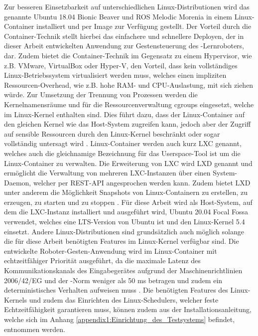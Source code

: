 Zur besseren Einsetzbarkeit auf unterschiedlichen Linux-Distributionen wird das genannte Ubuntu 18.04 Bionic Beaver und ROS Melodic Morenia in einem Linux-Container installiert und per Image zur Verfügung gestellt. Der Vorteil durch die Container-Technik stellt hierbei das einfachere und schnellere Deployen, der in dieser Arbeit entwickelten Anwendung zur Gestensteuerung des -Lernroboters, dar. Zudem bietet die Container-Technik im Gegensatz zu einem Hypervisor, wie z.B. VMware, VirtualBox oder Hyper-V, den Vorteil, dass kein vollständiges Linux-Betriebssystem virtualisiert werden muss, welches einen impliziten Ressourcen-Overhead, wie z.B. hohe RAM- und CPU-Auslastung, mit sich ziehen würde. Zur Umsetzung der Trennung von Prozessen werden die Kernelnamensräume und für die Ressourcenverwaltung cgroups eingesetzt, welche im Linux-Kernel enthalten sind. Dies führt dazu, dass der Linux-Container auf den gleichen Kernel wie das Host-System zugreifen kann, jedoch aber der Zugriff auf sensible Ressourcen durch den Linux-Kernel beschränkt oder sogar vollständig untersagt wird \cite{lxc_2020}. Linux-Container werden auch kurz LXC genannt, welches auch die gleichnamige Bezeichnung für das Userspace-Tool ist um die Linux-Container zu verwalten. Die Erweiterung von LXC wird LXD genannt und ermöglicht die Verwaltung von mehreren LXC-Instanzen über einen System-Daemon, welcher per REST-API angesprochen werden kann. Zudem bietet LXD unter anderem die Möglichkeit Snapshots von Linux-Containern zu erstellen, zu erzeugen, zu starten und zu stoppen \cite{lxc_2017}. Für diese Arbeit wird als Host-System, auf dem die LXC-Instanz installiert und ausgeführt wird, Ubuntu 20.04 Focal Fossa verwendet, welches eine LTS-Version von Ubuntu ist und den Linux-Kernel 5.4 einsetzt. Andere Linux-Distributionen sind grundsätzlich auch möglich solange die für diese Arbeit benötigten Features im Linux-Kernel verfügbar sind. Die entwickelte Roboter-Gesten-Anwendung wird im Linux-Container mit echtzeitfähiger Priorität ausgeführt, da die maximale Latenz des Kommunikationskanals des Eingabegerätes aufgrund der Maschinenrichtlinien 2006/42/EG und der -Norm weniger als 50 ms betragen und zudem ein deterministisches Verhalten aufweisen muss \cite[55]{prassler_advances_2004}. Die benötigten Features des Linux-Kernels und zudem das Einrichten des Linux-Schedulers, welcher feste Echtzeitfähigkeit garantieren muss, können zudem aus der Installationsanleitung, welche sich im Anhang \ref{appendix1:Einrichtung_des_Testsystems} befindet, entnommen werden.

